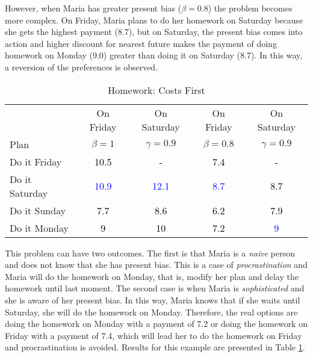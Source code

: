 \documentclass[]{article}
\begin{document}
However, when Maria has greater present bias (\(\beta = 0.8\)) the problem becomes more complex. On Friday, Maria plans to do her homework on Saturday because she gets the highest payment (8.7), but on Saturday, the present bias comes into action and higher discount for nearest future makes the payment of doing homework on Monday (9.0) greater than doing it on Saturday (8.7). In this way, a reversion of the preferences is observed.

\begin{table}

\caption{\label{tab:s1}Homework: Costs First}
\centering
\begin{tabular}[t]{lcccc}
\toprule
\multicolumn{1}{c}{} & \multicolumn{1}{c}{On Friday} & \multicolumn{1}{c}{On Saturday} & \multicolumn{1}{c}{On Friday} & \multicolumn{1}{c}{On Saturday} \\
\cmidrule(l{3pt}r{3pt}){2-2} \cmidrule(l{3pt}r{3pt}){3-3} \cmidrule(l{3pt}r{3pt}){4-4} \cmidrule(l{3pt}r{3pt}){5-5}
Plan & $\beta = 1$ & $\gamma = 0.9$ & $\beta= 0.8$ & $\gamma = 0.9$\\
\midrule
Do it Friday & \textcolor{black}{10.5} & \textcolor{black}{-} & \textcolor{black}{7.4} & \textcolor{black}{-}\\
Do it Saturday & \textcolor{blue}{10.9} & \textcolor{blue}{12.1} & \textcolor{blue}{8.7} & \textcolor{black}{8.7}\\
Do it Sunday & \textcolor{black}{7.7} & \textcolor{black}{8.6} & \textcolor{black}{6.2} & \textcolor{black}{7.9}\\
Do it Monday & \textcolor{black}{9} & \textcolor{black}{10} & \textcolor{black}{7.2} & \textcolor{blue}{9}\\
\bottomrule
\end{tabular}
\end{table}

This problem can have two outcomes. The first is that Maria is a \emph{naive} person and does not know that she has present bias. This is a case of \emph{procrastination} and Maria will do the homework on Monday, that is, modify her plan and delay the homework until last moment. The second case is when Maria is \emph{sophisticated} and she is aware of her present bias. In this way, Maria knows that if she waits until Saturday, she will do the homework on Monday. Therefore, the real options are doing the homework on Monday with a payment of 7.2 or doing the homework on Friday with a payment of 7.4, which will lead her to do the homework on Friday and procrastination is avoided. Results for this example are presented in Table \ref{tab:s1}.
\end{document}
